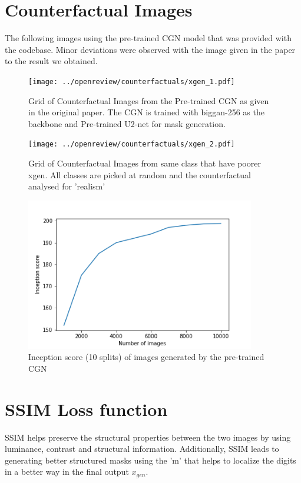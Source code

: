 \begin{appendices}
\section{Counterfactual Images}
The following images using the pre-trained CGN model that was provided with the codebase. Minor deviations were observed with the image given in the paper to the result we obtained. 
\begin{figure}[ht!]
\centering
    \texttt{[image: ../openreview/counterfactuals/xgen\_1.pdf]}
    \caption{Grid of Counterfactual Images from the Pre-trained CGN \cite{sauer2021counterfactual} as given in the original paper. The CGN is trained with biggan-256 as the backbone and Pre-trained U2-net for mask generation.  
    }
    \label{fig:original_counterfactuals}
\end{figure}

\begin{figure}[ht!]
\centering 
    \texttt{[image: ../openreview/counterfactuals/xgen\_2.pdf]}
    \caption{Grid of Counterfactual Images from same class that have poorer x{gen}.
    All classes are picked at random and the counterfactual analysed for 'realism'}
    \label{fig:poor_counterfactuals}
\end{figure}

\begin{figure}[h!]
    \centering
    \includegraphics[width=10cm]{../openreview/images/inception.png}
    \caption{Inception score (10 splits) of images generated by the pre-trained CGN}
    \label{fig:inception}
\end{figure}

\newpage
\section{SSIM Loss function}
SSIM \cite{wang2004image} helps preserve the structural properties between the two images by using luminance, contrast and structural information. Additionally, SSIM \cite{wang2004image} leads to generating better structured masks using the 'm' that helps to localize the digits in a better way in the final output $x_{gen}$.


\end{appendices}
